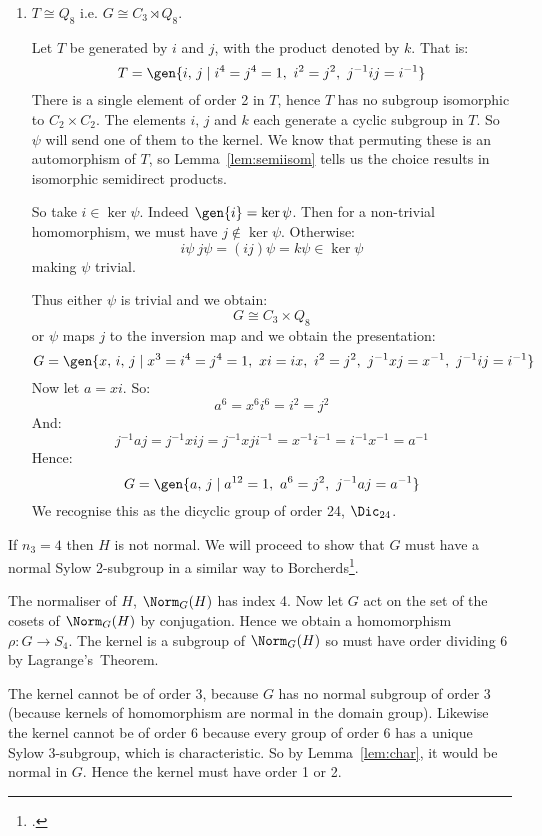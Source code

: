 \begin{enumerate}
    \item \(T \cong Q_8\) i.e. \(G \cong C_3 \rtimes Q_8\).

        Let \(T\) be generated by \(i\) and \(j\), with the product denoted by \(k\).
        That is:
        \[T = \gen{i,\,j \mid i^4 = j^4 = 1,\ i^2 = j^2,\ j^{-1}ij = i^{-1}}\]
        There is a single element of order 2 in \(T\), hence \(T\) has no subgroup isomorphic to \(C_2 \times C_2\).
        The elements \(i,\,j\) and \(k\) each generate a cyclic subgroup in \(T\).
        So \(\psi\) will send one of them to the kernel.
        We know that permuting these is an automorphism of \(T\), so Lemma~\ref{lem:semiisom} tells us the choice
        results in isomorphic semidirect products.

        So take \(i \in \ker{\psi}\).
        Indeed \(\gen{i} = \ker\psi\).
        Then for a non-trivial homomorphism, we must have \(j \notin \ker{\psi}\).
        Otherwise:
        \[i\psi\ j\psi = (ij)\psi = k\psi \in \ker{\psi}\]
        making \(\psi\) trivial.

        Thus either \(\psi\) is trivial and we obtain:
        \[G \cong C_3 \times Q_8\]
        or \(\psi\) maps \(j\) to the inversion map and we obtain the presentation:
        \[G = \gen{x,\,i,\,j \mid x^3 = i^4 = j^4 = 1,\ xi = ix,\ i^2 = j^2,\ j^{-1}xj = x^{-1},\ j^{-1}ij = i^{-1}}\]
        Now let \(a = xi\).
        So:
        \[a^6 = x^6 i^6 = i^2 = j^2\]
        And:
        \[j^{-1}aj = j^{-1}xij = j^{-1}xji^{-1} = x^{-1}i^{-1} = i^{-1}x^{-1} = a^{-1}\]
        Hence:
        \[G = \gen{a,\,j \mid a^{12} = 1,\ a^6 = j^2,\ j^{-1}aj = a^{-1}}\]
        We recognise this as the dicyclic group of order 24, \(\Dic_{24}\).

\end{enumerate}

If \(n_3 = 4\) then \(H\) is not normal.
We will proceed to show that \(G\) must have a normal Sylow 2-subgroup in a similar way to Borcherds\footcite{order24}.

The normaliser of \(H\), \(\Norm_G(H)\) has index 4.
Now let \(G\) act on the set of the cosets of \(\Norm_G(H)\) by conjugation.
Hence we obtain a homomorphism \(\rho:G \to S_4\).
The kernel is a subgroup of \(\Norm_G(H)\) so must have order dividing 6 by Lagrange's~Theorem.

The kernel cannot be of order 3, because \(G\) has no normal subgroup of order 3 (because kernels of homomorphism are
normal in the domain group).
Likewise the kernel cannot be of order 6 because every group of order 6 has a unique Sylow 3-subgroup, which is
characteristic.
So by Lemma~\ref{lem:char}, it would be normal in \(G\).
Hence the kernel must have order 1 or 2.

